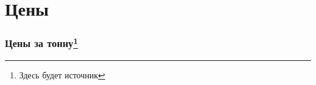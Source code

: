 \section{Цены}

\begin{frame}[fragile]
    \frametitle{Цены за тонну\footnote{Здесь будет источник}}
    \begin{center}
    
    \end{center}
\end{frame}